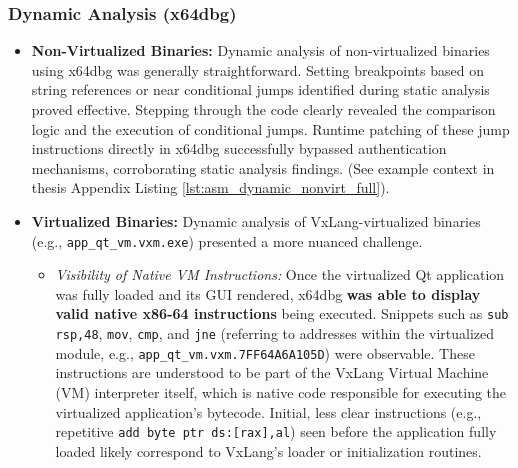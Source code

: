 \subsubsection{Dynamic Analysis (x64dbg)}
\begin{itemize}
    \item \textbf{Non-Virtualized Binaries:} Dynamic analysis of non-virtualized binaries using x64dbg was generally straightforward. Setting breakpoints based on string references or near conditional jumps identified during static analysis proved effective. Stepping through the code clearly revealed the comparison logic and the execution of conditional jumps. Runtime patching of these jump instructions directly in x64dbg successfully bypassed authentication mechanisms, corroborating static analysis findings. (See example context in thesis Appendix Listing \ref{lst:asm_dynamic_nonvirt_full}).

    \item \textbf{Virtualized Binaries:} Dynamic analysis of VxLang-virtualized binaries (e.g., \texttt{app\_qt\_vm.vxm.exe}) presented a more nuanced challenge.
    \begin{itemize}
        \item \textit{Visibility of Native VM Instructions:} Once the virtualized Qt application was fully loaded and its GUI rendered, x64dbg \textbf{was able to display valid native x86-64 instructions} being executed. Snippets such as \texttt{sub rsp,48}, \texttt{mov}, \texttt{cmp}, and \texttt{jne} (referring to addresses within the virtualized module, e.g., \texttt{app\_qt\_vm.vxm.7FF64A6A105D}) were observable. These instructions are understood to be part of the VxLang Virtual Machine (VM) interpreter itself, which is native code responsible for executing the virtualized application's bytecode. Initial, less clear instructions (e.g., repetitive \texttt{add byte ptr ds:[rax],al}) seen before the application fully loaded likely correspond to VxLang's loader or initialization routines. 


\end{itemize}
\end{itemize}
